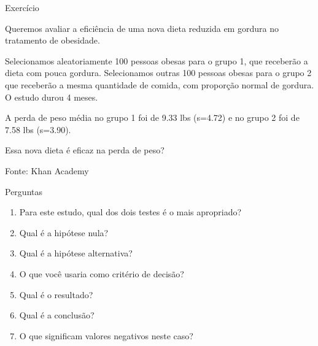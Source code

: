 \documentclass{beamer}
\begin{document}
\begin{frame}{Exercício}
  \begin{exampleblock}{}
    \small
    Queremos avaliar a eficiência de uma nova dieta reduzida em
    gordura no tratamento de obesidade.

    \bigskip
    {\footnotesize
      Selecionamos aleatoriamente 100 pessoas obesas para o grupo 1, que receberão a dieta com pouca gordura.
      Selecionamos outras 100 pessoas obesas para o grupo 2 que receberão a mesma quantidade de comida, com proporção normal de gordura.
      O estudo durou 4 meses.
    }

    \bigskip
    \begin{exampleblock}{}
      \footnotesize
      A perda de peso média no grupo 1 foi de 9.33 lbs
      (s=4.72) e no grupo 2 foi de 7.58 lbs (s=3.90).
    \end{exampleblock}
  \end{exampleblock}
  \begin{block}{}
    Essa nova dieta é eficaz na perda de peso?
  \end{block}
  \hfill {\footnotesize Fonte: Khan Academy}
\end{frame}

\begin{frame}[label=perguntas]{Perguntas}
  \begin{enumerate}
  \item Para este estudo, qual dos dois testes é o mais apropriado?
  \item Qual é a hipótese nula?
  \item Qual é a hipótese alternativa?
  \item O que você usaria como critério de decisão?
  \item Qual é o resultado?
  \item Qual é a conclusão?
  \item O que significam valores negativos neste caso?
  \end{enumerate}
\end{frame}
\end{document}
